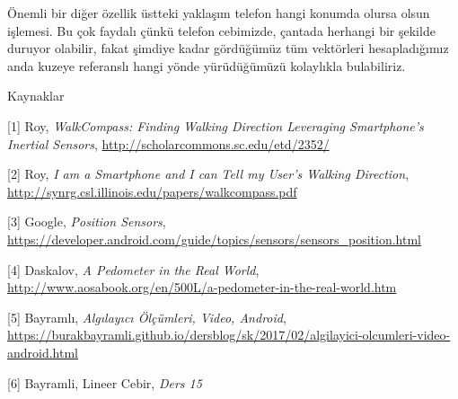\documentclass[12pt,fleqn]{article}\usepackage{../../common}
\begin{document}
Önemli bir diğer özellik üstteki yaklaşım telefon hangi konumda olursa
olsun işlemesi. Bu çok faydalı çünkü telefon cebimizde, çantada herhangi
bir şekilde duruyor olabilir, fakat şimdiye kadar gördüğümüz tüm vektörleri
hesapladığımız anda kuzeye referanslı hangi yönde yürüdüğümüzü kolaylıkla
bulabiliriz.

Kaynaklar

[1] Roy, {\em WalkCompass: Finding Walking Direction Leveraging Smartphone's Inertial Sensors}, 
    \url{http://scholarcommons.sc.edu/etd/2352/}

[2] Roy, {\em I am a Smartphone and I can Tell my User's Walking Direction}, 
    \url{http://synrg.csl.illinois.edu/papers/walkcompass.pdf} 

[3] Google, {\em Position Sensors}, 
    \url{https://developer.android.com/guide/topics/sensors/sensors_position.html}

[4] Daskalov, {\em A Pedometer in the Real World}, 
    \url{http://www.aosabook.org/en/500L/a-pedometer-in-the-real-world.htm}

[5] Bayramlı, 
    {\em Algılayıcı Ölçümleri, Video, Android}, 
    \url{https://burakbayramli.github.io/dersblog/sk/2017/02/algilayici-olcumleri-video-android.html}

[6] Bayramli, Lineer Cebir, {\em Ders 15}
\end{document}
